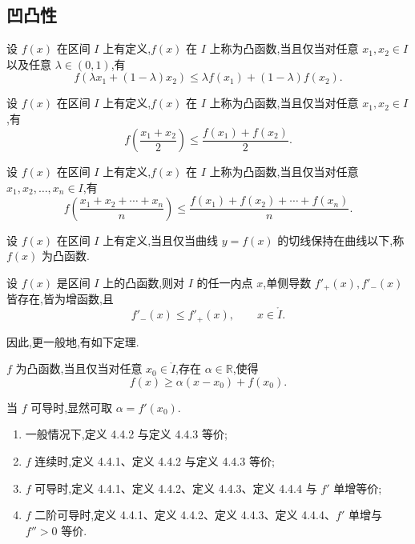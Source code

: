 \documentclass[../数学分析培优讲义.tex]{subfiles}
\begin{document}
\subsection{凹凸性}

\begin{definition}
设 $f(x)$ 在区间 $I$ 上有定义,$f(x)$ 在 $I$ 上称为凸函数,当且仅当对任意 $x_1,x_2\in I$ 以及任意 $\lambda\in(0,1)$,有
\[
    f(\lambda x_1+(1-\lambda)x_2)
    \leq\lambda f(x_1)+(1-\lambda)f(x_2).
\]
\end{definition}

\begin{definition}
设 $f(x)$ 在区间 $I$ 上有定义,$f(x)$ 在 $I$ 上称为凸函数,当且仅当对任意 $x_1,x_2\in I$,有
\[
    f\left(\dfrac{x_1+x_2}{2}\right)
    \leq\dfrac{f(x_1)+f(x_2)}{2}.
\]
\end{definition}

\begin{definition}
设 $f(x)$ 在区间 $I$ 上有定义,$f(x)$ 在 $I$ 上称为凸函数,当且仅当对任意 $x_1,x_2,\ldots,x_n\in I$,有
\[
    f\left(\dfrac{x_1+x_2+\cdots+x_n}{n}\right)
    \leq\dfrac{f(x_1)+f(x_2)+\cdots+f(x_n)}{n}.
\]
\end{definition}

\begin{definition}
设 $f(x)$ 在区间 $I$ 上有定义,当且仅当曲线 $y=f(x)$ 的切线保持在曲线以下,称 $f(x)$ 为凸函数.
\end{definition}

\begin{lemma}[\markstar]
设 $f(x)$ 是区间 $I$ 上的凸函数,则对 $I$ 的任一内点 $x$,单侧导数 $f'_+(x),f'_-(x)$ 皆存在,皆为增函数,且
\[
    f'_-(x)\leq f'_+(x),
    \qquad x\in\mathring I.
\]
\end{lemma}

因此,更一般地,有如下定理.

\begin{theorem}[\markstar]
$f$ 为凸函数,当且仅当对任意 $x_0\in\mathring I$,存在 $\alpha\in\mathbb{R}$,使得
\[
    f(x)\geq\alpha(x-x_0)+f(x_0).
\]
\end{theorem}

\begin{remark}
当 $f$ 可导时,显然可取 $\alpha=f'(x_0)$.
\end{remark}

\begin{theorem}[\markstar]
\begin{enumerate}[label=(\arabic*)]
    \item 一般情况下,定义 4.4.2 与定义 4.4.3 等价;
    \item $f$ 连续时,定义 4.4.1、定义 4.4.2 与定义 4.4.3 等价;
    \item $f$ 可导时,定义 4.4.1、定义 4.4.2、定义 4.4.3、定义 4.4.4 与 $f'$ 单增等价;
    \item $f$ 二阶可导时,定义 4.4.1、定义 4.4.2、定义 4.4.3、定义 4.4.4、$f'$ 单增与 $f''>0$ 等价.
\end{enumerate}
\end{theorem}
\end{document}
